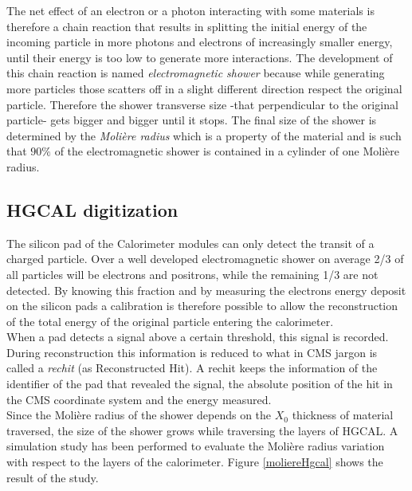 The net effect of an electron or a photon interacting with some materials is therefore a chain reaction that results in splitting the initial energy of the incoming particle in more photons and electrons of increasingly smaller energy, until their energy is too low to generate more interactions.
The development of this chain reaction is named \textit{electromagnetic shower} because while generating more particles those scatters off in a slight different direction respect the original particle. Therefore the shower transverse size -that perpendicular to the original particle- gets bigger and bigger until it stops. The final size of the shower is determined by the \textit{Molière radius} which is a property of the material and is such that $90\%$ of the electromagnetic shower is contained in a cylinder of one Molière radius.

\subsection{HGCAL digitization}
The silicon pad of the Calorimeter modules can only detect the transit of a charged particle. Over a well developed electromagnetic shower on average 2/3 of all particles will be electrons and positrons, while the remaining 1/3 are not detected. By knowing this fraction and by measuring the electrons energy deposit on the silicon pads a calibration is therefore possible to allow the reconstruction of the total energy of the original particle entering the calorimeter.\\
When a pad detects a signal above a certain threshold, this signal is recorded. During reconstruction this information is reduced to what in CMS jargon is called a \textit{rechit} (as Reconstructed Hit). A rechit keeps the information of the identifier of the pad that revealed the signal, the absolute position of the hit in the CMS coordinate system and the energy measured.\\
Since the Molière radius of the shower depends on the $X_0$ thickness of material traversed, the size of the shower grows while traversing the layers of HGCAL. A simulation study has been performed to evaluate the Molière radius variation with respect to the layers of the calorimeter. Figure \ref{moliereHgcal} shows the result of the study.\\

